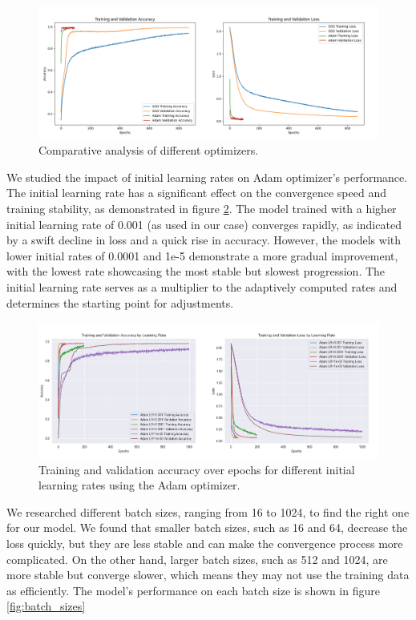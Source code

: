 \begin{figure}[ht!]
	\centering
	\includegraphics[width=\textwidth]{images/optimizers_comparison.png}
	\caption{Comparative analysis of different optimizers.}
	\label{fig:optimizers}
\end{figure}


We studied the impact of initial learning rates on Adam optimizer's performance. The initial learning rate has a significant effect on the convergence speed and training stability, as demonstrated in figure \ref{fig:learning_rates}.\newline
The model trained with a higher initial learning rate of 0.001 (as used in our case) converges rapidly, as indicated by a swift decline in loss and a quick rise in accuracy. However, the models with lower initial rates of 0.0001 and 1e-5 demonstrate a more gradual improvement, with the lowest rate showcasing the most stable but slowest progression.\newline
The initial learning rate serves as a multiplier to the adaptively computed rates and determines the starting point for adjustments.
\begin{figure}[ht!]
	\centering
	\includegraphics[width=\textwidth]{images/adam_learning_rates_comparison.png}
	\caption{Training and validation accuracy over epochs for different initial learning rates using the Adam optimizer.}
	\label{fig:learning_rates}
\end{figure}

We researched different batch sizes, ranging from 16 to 1024, to find the right one for our model. We found that smaller batch sizes, such as 16 and 64, decrease the loss quickly, but they are less stable and can make the convergence process more complicated. On the other hand, larger batch sizes, such as 512 and 1024, are more stable but converge slower, which means they may not use the training data as efficiently. The model's performance on each batch size is shown in figure \ref{fig:batch_sizes}

